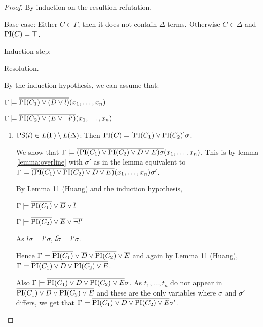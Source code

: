 	\begin{proof}
	By induction on the resultion refutation.

	Base case:
	Either $C \in \Gamma$, then it does not contain $\Delta$-terms.
	Otherwise $C \in \Delta$ and $\mathrm{PI}(C) = \top$.

	Induction step:
	\begin{description}
		\item{Resolution.}
			\begin{prooftree}
			\end{prooftree}

			By the induction hypothesis, we can assume that:

			$\Gamma \models \overline{\mathrm{PI}(C_1) \lor (D\lor l)}(x_1, \ldots, x_n)$

			$\Gamma \models \overline{\mathrm{PI}(C_2) \lor (E\lor \lnot l')}(x_{1}, \ldots, x_n)$

			\begin{enumerate}
				\item $\mathrm{PS}(l) \in L(\Gamma) \setminus L(\Delta)$:
					Then $\mathrm{PI}(C) = [\mathrm{PI}(C_1) \lor \mathrm{PI}(C_2)]\sigma$. 

					We show that $\Gamma \models \overline{(\mathrm{PI}(C_1) \lor \mathrm{PI}(C_2) \lor D \lor E)\sigma}(x_1, \ldots, x_n) $.
					This is by lemma \ref{lemma:overline} with $\sigma'$ as in the lemma equivalent to
					$\Gamma \models \overline{(\mathrm{PI}(C_1) \lor \mathrm{PI}(C_2) \lor D \lor E)}(x_1, \ldots, x_n)\sigma' $.

					By Lemma 11 (Huang) and the induction hypothesis,

					$\Gamma \models \overline{\mathrm{PI}(C_1)} \lor \overline{D} \lor \overline l$

					$\Gamma \models \overline{\mathrm{PI}(C_2)} \lor \overline{E} \lor \overline{\lnot l'}$

					As $l\sigma = l'\sigma$, $\overline{l\sigma} = \overline{l'\sigma}$.

					Hence $\Gamma \models \overline{\mathrm{PI}(C_1)} \lor \overline{D} \lor \overline{\mathrm{PI}(C_2)} \lor \overline{E}$
					and again by Lemma 11 (Huang), 
					$\Gamma \models \overline{\mathrm{PI}(C_1) \lor D \lor \mathrm{PI}(C_2) \lor E}$.

					Also
					$\Gamma \models \overline{\mathrm{PI}(C_1) \lor D \lor \mathrm{PI}(C_2) \lor E}\sigma$.
					As $ t_1, \ldots, t_n $ do not appear in $\overline{\mathrm{PI}(C_1) \lor D \lor \mathrm{PI}(C_2) \lor E}$ and these are the only variables where $\sigma$ and $\sigma'$ differs, we get that 
					$\Gamma \models \overline{\mathrm{PI}(C_1) \lor D \lor \mathrm{PI}(C_2) \lor E}\sigma'$.



\end{enumerate}
\end{description}
\end{proof}
